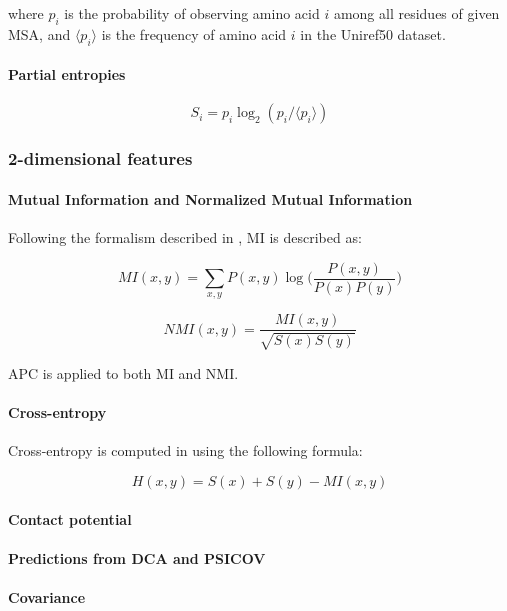             where $p_i$ is the probability of observing amino acid $i$ among all residues
            of given MSA, and $\langle p_i \rangle$ is the frequency of amino acid $i$
            in the Uniref50 dataset.

        \paragraph{Partial entropies}

            \cite{Michel383133}

            \begin{equation}
                S_i = p_i \log_2 (p_i / \langle p_i \rangle)
            \end{equation}

    \subsubsection{2-dimensional features}

        \paragraph{Mutual Information and Normalized Mutual Information}

            Following the formalism described in \cite{Michel383133}, MI is described as:

            \begin{equation}
                MI(x, y) = \sum\limits_{x, y} P(x, y) \log \Big( \frac{P(x, y)}{P(x) P(y)} \Big)
            \end{equation}

            \begin{equation}
                NMI(x, y) = \frac{MI(x, y)}{\sqrt{S(x) S(y)}}
            \end{equation}

            APC is applied to both MI and NMI.

        \paragraph{Cross-entropy}

            Cross-entropy is computed in \cite{Michel383133} using the following formula:
            
            \begin{equation}
                H(x, y) = S(x) + S(y) - MI(x, y)
            \end{equation}

        \paragraph{Contact potential}

        \paragraph{Predictions from DCA and PSICOV}

        \paragraph{Covariance}
